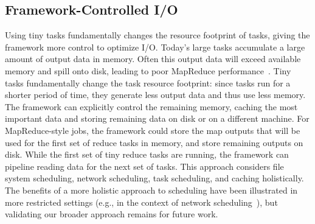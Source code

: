 \subsection{Framework-Controlled I/O}
\label{sec:pipeline}
Using tiny tasks fundamentally changes the resource footprint of tasks,
giving the framework more control to optimize I/O.
Today's large tasks accumulate a large amount of output data in memory.
Often this output data will exceed available memory and spill onto disk,
leading to poor MapReduce performance~\cite{lipcon2012optimizing}.
Tiny tasks fundamentally change the task resource footprint: since tasks
run for a shorter period of time, they generate less output data and thus use
less memory. The framework can explicitly control the remaining memory, caching
the most important data and storing remaining data on disk or on a different
machine.
For MapReduce-style jobs, the framework could store the map
outputs that will be used for the first set of reduce tasks in memory, and store
remaining outputs on disk. While the first set of tiny reduce tasks are running,
the framework can pipeline reading data for the next set of tasks.
This approach considers file system scheduling, network scheduling, task scheduling,
and caching holistically. The benefits of a more holistic approach to
scheduling have been illustrated in more restricted settings (e.g., in the
context of network scheduling~\cite{chowdhury2012coflow,chowdhury2011managing}),
but validating our broader approach remains for future work.

